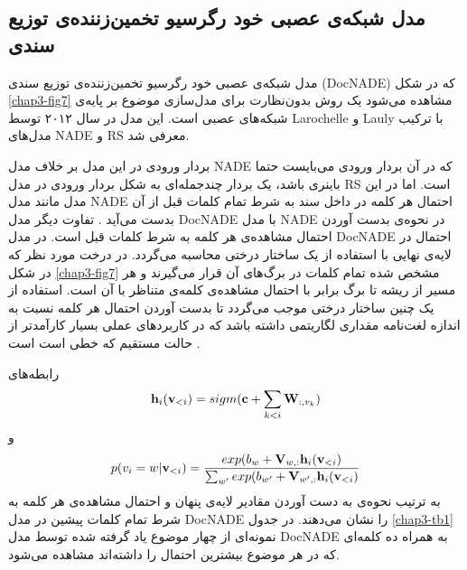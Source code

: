 	\subsection{مدل شبکه‌‌ی عصبی خود رگرسیو تخمین‌زننده‌ی توزیع سندی}
	\label{chap3sec3sub6}
مدل شبکه‌‌ی عصبی خود رگرسیو تخمین‌زننده‌ی توزیع سندی
(DocNADE)
که در شکل
\ref{chap3-fig7}
مشاهده می‌‌شود یک روش بدون‌نظارت برای مدل‌سازی موضوع بر پایه‌ی شبکه‌های عصبی است. این مدل در سال ۲۰۱۲ توسط
Larochelle
و
Lauly \cite{larochelle2012neural}
با ترکیب مدل‌های
NADE
و
RS
معرفی‌ شد.

 بردار ورودی در این مدل بر خلاف مدل
NADE
که در آن بردار ورودی می‌‌بایست حتما باینری باشد، یک بردار چندجمله‌ای به شکل بردار ورودی در مدل
RS
است. اما در این مدل مانند مدل
NADE
احتمال هر کلمه در داخل سند به شرط تمام کلمات قبل از آن بدست می‌‌آید
\cite{larochelle2012neural}.
 تفاوت دیگر مدل
DocNADE
با مدل
NADE
در نحوه‌ی بدست آوردن احتمال مشاهده‌ی هر کلمه به شرط کلمات قبل است. در مدل
DocNADE
احتمال در لایه‌ی نهایی با استفاده از یک ساختار درختی محاسبه می‌‌گردد. در درخت مورد نظر که در شکل
\ref{chap3-fig7}
مشخص شده تمام کلمات در برگ‌های آن قرار می‌‌گیرند و هر مسیر از ریشه تا برگ برابر با احتمال مشاهده‌ی ‌کلمه‌ی متناظر با آن است. استفاده از یک چنین ساختار درختی موجب می‌‌گردد تا بدست آوردن احتمال هر کلمه نسبت به اندازه لغت‌نامه مقداری لگاریتمی داشته باشد که در کاربرد‌های عملی‌ بسیار کارآمدتر از حالت مستقیم که خطی‌ است است
\cite{larochelle2012neural}.

رابطه‌های
\begin{align}
	\centering
	\textbf{h}_i(\textbf{v}_{<i}) = sigm(\textbf{c}+\sum_{k<i}\textbf{W}_{:,v_k})
	\label{chap3-eq13}
\end{align}
و
\begin{align}
	\centering
	p(v_i=w|\textbf{v}_{<i}) = \frac{exp(b_w +\textbf{V}_{w,:}\textbf{h}_i(\textbf{v}_{<i})}{\sum_{w'}exp(b_{w'}+\textbf{V}_{w',:}\textbf{h}_i(\textbf{v}_{<i})}
	\label{chap3-eq14}
\end{align}
به ترتیب نحوه‌ی به دست آوردن مقادیر لایه‌ی پنهان و احتمال مشاهده‌ی هر کلمه به شرط تمام کلمات پیشین در مدل
DocNADE
 را نشان می‌‌دهند. در جدول
\ref{chap3-tb1}
نمونه‌ای از چهار موضوع یاد گرفته شده توسط مدل
DocNADE
به همراه ده کلمه‌ای‌ که در هر موضوع بیشترین احتمال را داشته‌اند مشاهده می‌شود.

